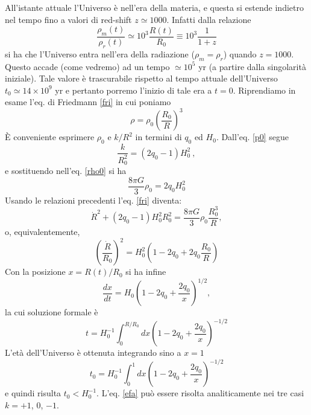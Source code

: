 All'istante attuale l'Universo è nell'era della materia, e questa si estende
indietro nel tempo fino a valori di red-shift $z \simeq 1000$.  Infatti dalla
relazione
\begin{equation}
  \frac {\rho_m(t)} {\rho_r(t)} \simeq  10^{3} \frac {R(t)} {R_0} \equiv  10^3
  \frac{1}{1+z}
\end{equation}
si ha che l'Universo entra nell'era della radiazione ($\rho_m = \rho_r$) quando
$z = 1000$.  Questo accade (come vedremo) ad un tempo $ \simeq 10^5$ yr (a
partire dalla singolarità iniziale).  Tale valore è trascurabile rispetto al
tempo attuale dell'Universo $t_0 \simeq 14 \times 10^9$ yr e pertanto porremo
l'inizio di tale era a $t=0$.  Riprendiamo in esame l'eq. di Friedmann
\eqref{fri} in cui poniamo
\begin{equation}
  \rho = \rho_0 \left( \frac {R_0} {R} \right)^{3}
\end{equation}
È conveniente esprimere $\rho_0$ e $k/R^2$ in termini di $q_0$ ed $H_0$.
Dall'eq. \eqref{p0} segue
\begin{equation}
  \frac{k}{R_0^2}=(2q_0-1) H_0^2~,
\end{equation}
e sostituendo nell'eq. \eqref{rho0} si ha
\begin{equation}
  \frac{8\pi G}{3} \rho_0 = 2q_0 H_0^2
\end{equation}
Usando le relazioni precedenti l'eq. \eqref{fri} diventa:
\begin{equation}
  \dot{R}^2 + (2 q_0-1) H_0^2 R_0^2 = \frac{8\pi G}{3} \rho_0 \frac{R_0^3}{R},
\end{equation}
o, equivalentemente,
\begin{equation}
  \left(\frac{\dot R}{R_0}\right)^2 = H_0^2 \left(1-2q_0+2 q_0
    \frac{R_0}{R}\right)
\end{equation}
Con la posizione $x=R(t)/R_0$ si ha infine
\begin{equation}
  \frac{dx}{dt}= H_0 \left(1-2q_0+ \frac {2q_0}{x}\right)^{1/2},
\end{equation}
la cui soluzione formale è
\begin{equation}
  t= H_0^{-1} \int_0^{R/R_0} dx \left(1-2q_0+\frac{2q_0}{x}\right)^{-1/2}
  \label{efa}
\end{equation}
L'età dell'Universo è ottenuta integrando sino a $x=1$
\begin{equation}
  t_0= H_0^{-1} \int_0^{1} dx \left(1-2q_0+\frac{2q_0}{x}\right)^{-1/2}
\end{equation}
e quindi risulta $t_0< H_0^{-1}$.  L'eq. \eqref{efa} può essere risolta
analiticamente nei tre casi $k=+1$, $0$, $-1$.

